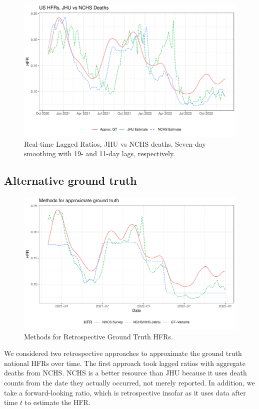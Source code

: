 \documentclass{article}
\begin{document}

\begin{figure}
    \centering
    \includegraphics[width=0.7\linewidth]{Figs/Real/jhu_vs_nchs.pdf}
    \caption{Real-time Lagged Ratios, JHU vs NCHS deaths. Seven-day smoothing with 19- and 11-day lags, respectively.}
    \label{fig:jhu_vs_nchs}
\end{figure}


\subsection{Alternative ground truth}\label{apx:alt_gt}

\begin{figure}
    \centering
    \includegraphics[width=0.8\linewidth]{Figs/Real/ApproxGT.pdf}
    \caption{Methods for Retrospective Ground Truth HFRs.}
    \label{fig:approxGT}
\end{figure}

We considered two retrospective approaches to approximate the ground truth national HFRs over time. The first approach took lagged ratios with aggregate deaths from NCHS. NCHS is a better resource than JHU because it uses death counts from the date they actually occurred, not merely reported. In addition, we take a forward-looking ratio, which is retrospective insofar as it uses data after time $t$ to estimate the HFR.
\end{document}

